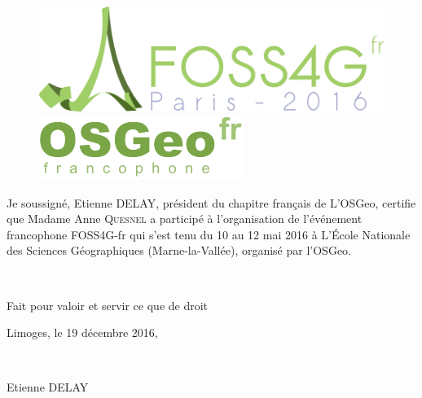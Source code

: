 \documentclass[parskip]{scrartcl}
\begin{document}
\begin{figure}
	\begin{center}
		\includegraphics[scale=0.2]{logo-foss4gfr}
        \hspace{1cm}
		\includegraphics[scale=0.4]{logo-osgeofr}
	\end{center}
\end{figure}


\vfill

Je soussigné, Etienne DELAY, président du chapitre français de L'OSGeo, certifie que Madame Anne \textsc{Quesnel} a participé à l'organisation de l'événement francophone FOSS4G-fr qui s'est tenu du 10 au 12 mai 2016
à L'\'Ecole Nationale des Sciences Géographiques (Marne-la-Vallée), organisé par l'OSGeo.

~

\noindent Fait pour valoir et servir ce que de droit

Limoges, le 19 décembre 2016,

~


\hfill Etienne DELAY

\vfill
\end{document}
